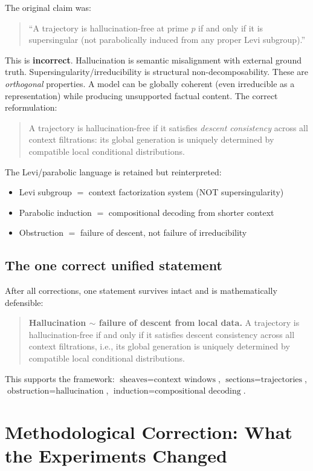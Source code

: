 \documentclass[11pt,a4paper]{article}
\begin{document}
The original claim was:
\begin{quote}
``A trajectory is hallucination-free at prime $p$ if and only if it is
supersingular (not parabolically induced from any proper Levi subgroup).''
\end{quote}
This is \textbf{incorrect}. Hallucination is semantic misalignment with
external ground truth. Supersingularity/irreducibility is structural
non-decomposability. These are \emph{orthogonal} properties.
A model can be globally coherent (even irreducible as a representation)
while producing unsupported factual content.
The correct reformulation:
\begin{quote}
A trajectory is hallucination-free if it satisfies \emph{descent consistency}
across all context filtrations: its global generation is uniquely determined
by compatible local conditional distributions.
\end{quote}
The Levi/parabolic language is retained but reinterpreted:
\begin{itemize}
  \item Levi subgroup $= $ context factorization system (NOT supersingularity)
  \item Parabolic induction $= $ compositional decoding from shorter context
  \item Obstruction $= $ failure of descent, not failure of irreducibility
\end{itemize}

\subsection*{The one correct unified statement}

After all corrections, one statement survives intact and is
mathematically defensible:
\begin{quote}
\textbf{Hallucination $\sim$ failure of descent from local data.}
A trajectory is hallucination-free if and only if it satisfies
descent consistency across all context filtrations, i.e., its global
generation is uniquely determined by compatible local conditional
distributions.
\end{quote}
This supports the framework:
$\text{sheaves} = \text{context windows}$,
$\text{sections} = \text{trajectories}$,
$\text{obstruction} = \text{hallucination}$,
$\text{induction} = \text{compositional decoding}$.

\section{Methodological Correction: What the Experiments Changed}
\label{sec:correction}
\end{document}
